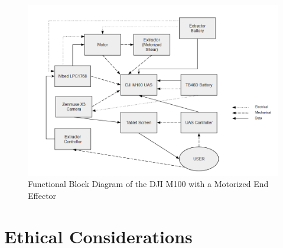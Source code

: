 \documentclass{wrcecapstone}
\begin{document}
\begin{figure}
\caption{Functional Block Diagram of the DJI M100 with a Motorized End Effector}
\label{fig:4.6.1}
\begin{center}
\includegraphics[width=\columnwidth]{figures/fig461.png}
\end{center}
\end{figure}







\section{Ethical Considerations}
\end{document}
